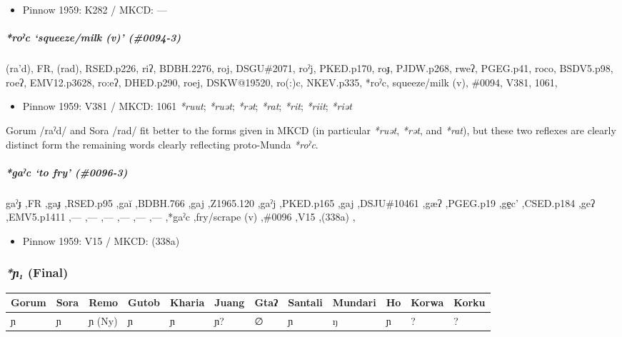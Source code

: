 \documentclass[a4paper,]{article}
\providecommand{\tightlist}{%
  \setlength{\itemsep}{0pt}\setlength{\parskip}{0pt}}
\let\oldsubparagraph\subparagraph
\renewcommand{\subparagraph}[1]{\oldsubparagraph{#1}\mbox{}}
\begin{document}
\begin{itemize}
\tightlist
\item
  Pinnow 1959: K282 / MKCD: ---
\end{itemize}

\subparagraph{\texorpdfstring{\emph{*roˀc} `squeeze/milk (v)'
(\#0094-3)}{*roˀc squeeze/milk (v) (\#0094-3)}}\label{roux2c0c-squeezemilk-v-0094-3}

(ra'd), FR, (rad), RSED.p226, riʔ, BDBH.2276, roj, DSGU\#2071, roˀj,
PKED.p170, roɟ, PJDW.p268, rweʔ, PGEG.p41, roco, BSDV5.p98, roeʔ,
EMV12.p3628, ro:eʔ, DHED.p290, roej, DSKW@19520, ro(:)c, NKEV.p335,
*roˀc, squeeze/milk (v), \#0094, V381, 1061,

\begin{itemize}
\tightlist
\item
  Pinnow 1959: V381 / MKCD: 1061 \emph{*ruut}; \emph{*ruət};
  \emph{*rət}; \emph{*rat}; \emph{*rit}; \emph{*riit}; \emph{*riət}
\end{itemize}

Gorum /raˀd/ and Sora /rad/ fit better to the forms given in MKCD (in
particular \emph{*ruət}, \emph{*rət}, and \emph{*rat}), but these two
reflexes are clearly distinct form the remaining words clearly
reflecting proto-Munda \emph{*roˀc}.

\subparagraph{\texorpdfstring{\emph{*gaˀc} `to fry'
(\#0096-3)}{*gaˀc to fry (\#0096-3)}}\label{gaux2c0c-to-fry-0096-3}

gaˀɟ ,FR ,gaɟ ,RSED.p95 ,gaĭ ,BDBH.766 ,gaj ,Z1965.120 ,gaˀj ,PKED.p165
,gaj ,DSJU\#10461 ,gæʔ ,PGEG.p19 ,ge̠c' ,CSED.p184 ,geʔ ,EMV5.p1411 ,---
,--- ,--- ,--- ,--- ,--- ,*gaˀc ,fry/scrape (v) ,\#0096 ,V15 ,(338a) ,

\begin{itemize}
\tightlist
\item
  Pinnow 1959: V15 / MKCD: (338a)
\end{itemize}

\subsubsection{\texorpdfstring{\emph{*ɲ₁}
(Final)}{*ɲ₁ (Final)}}\label{ux272-final}

\begin{longtable}[]{@{}llllllllllll@{}}
\toprule
Gorum & Sora & Remo & Gutob & Kharia & Juang & Gtaʔ & Santali & Mundari
& Ho & Korwa & Korku\tabularnewline
\midrule
\endhead
ɲ & ɲ & ɲ (Ny) & ɲ & ɲ & ɲ? & ∅ & ɲ & ŋ & ɲ & ? & ?\tabularnewline
\bottomrule
\end{longtable}
\end{document}
